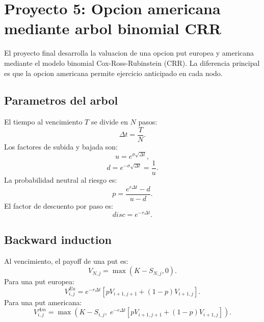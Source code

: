 \documentclass[12pt,a4paper]{article}
\begin{document}
\section{Proyecto 5: Opcion americana mediante arbol binomial CRR}

\begin{markdowncell}
El proyecto final desarrolla la valuacion de una opcion put europea y americana mediante el modelo binomial Cox-Ross-Rubinstein (CRR). La diferencia principal es que la opcion americana permite ejercicio anticipado en cada nodo.
\end{markdowncell}

\subsection{Parametros del arbol}

\begin{latexcell}
El tiempo al vencimiento \(T\) se divide en \(N\) pasos:
\[
\Delta t = \frac{T}{N}.
\]
Los factores de subida y bajada son:
\[
u=e^{\sigma\sqrt{\Delta t}},
\]
\[
d=e^{-\sigma\sqrt{\Delta t}}=\frac{1}{u}.
\]
La probabilidad neutral al riesgo es:
\[
p=\frac{e^{r\Delta t}-d}{u-d}.
\]
El factor de descuento por paso es:
\[
disc=e^{-r\Delta t}.
\]
\end{latexcell}

\subsection{Backward induction}

\begin{latexcell}
Al vencimiento, el payoff de una put es:
\[
V_{N,j}=\max(K-S_{N,j},0).
\]
Para una put europea:
\[
V_{i,j}^{Eu}=e^{-r\Delta t}\left[pV_{i+1,j+1}+(1-p)V_{i+1,j}\right].
\]
Para una put americana:
\[
V_{i,j}^{Am}=\max\left(K-S_{i,j},\; e^{-r\Delta t}\left[pV_{i+1,j+1}+(1-p)V_{i+1,j}\right]\right).
\]
\end{latexcell}
\end{document}
